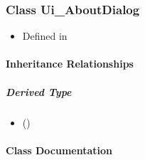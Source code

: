 \documentclass[letterpaper,10pt,english]{sphinxmanual}
\begin{document}
\sphinxstepscope


\subsubsection{Class Ui\_AboutDialog}
\label{\detokenize{api/classUi__AboutDialog:class-ui-aboutdialog}}\label{\detokenize{api/classUi__AboutDialog:exhale-class-classui-aboutdialog}}\label{\detokenize{api/classUi__AboutDialog::doc}}\begin{itemize}
\item {} 
\sphinxAtStartPar
Defined in 

\end{itemize}


\paragraph{Inheritance Relationships}
\label{\detokenize{api/classUi__AboutDialog:inheritance-relationships}}

\subparagraph{Derived Type}
\label{\detokenize{api/classUi__AboutDialog:derived-type}}\begin{itemize}
\item {} 
\sphinxAtStartPar
{} ({\hyperref[\detokenize{api/classUi_1_1AboutDialog:exhale-class-classui-1-1aboutdialog}]{}})

\end{itemize}


\paragraph{Class Documentation}
\label{\detokenize{api/classUi__AboutDialog:class-documentation}}
\end{document}
